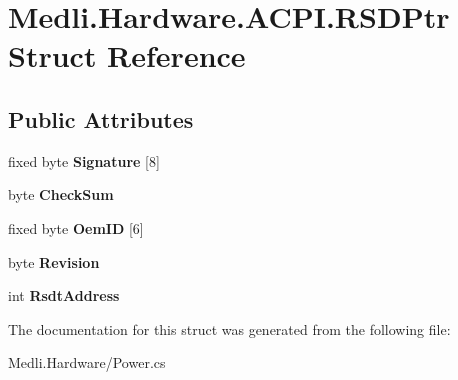 \hypertarget{struct_medli_1_1_hardware_1_1_a_c_p_i_1_1_r_s_d_ptr}{}\section{Medli.\+Hardware.\+A\+C\+P\+I.\+R\+S\+D\+Ptr Struct Reference}
\label{struct_medli_1_1_hardware_1_1_a_c_p_i_1_1_r_s_d_ptr}
\subsection*{Public Attributes}
\begin{DoxyCompactItemize}
\item 
\mbox{\label{struct_medli_1_1_hardware_1_1_a_c_p_i_1_1_r_s_d_ptr_ad05c7bc16e114453556ad8e32d99a1e0}} 
fixed byte {\bfseries Signature} \mbox{[}8\mbox{]}
\item 
\mbox{\label{struct_medli_1_1_hardware_1_1_a_c_p_i_1_1_r_s_d_ptr_afa2f1a1aa2bbb7f507fb534b07e79032}} 
byte {\bfseries Check\+Sum}
\item 
\mbox{\label{struct_medli_1_1_hardware_1_1_a_c_p_i_1_1_r_s_d_ptr_af276430a4c6bc4b329a673f7cdda72e6}} 
fixed byte {\bfseries Oem\+ID} \mbox{[}6\mbox{]}
\item 
\mbox{\label{struct_medli_1_1_hardware_1_1_a_c_p_i_1_1_r_s_d_ptr_ae9d18ec06d2feeab922f396674853d4b}} 
byte {\bfseries Revision}
\item 
\mbox{\label{struct_medli_1_1_hardware_1_1_a_c_p_i_1_1_r_s_d_ptr_ad9c3b629ce15de569237643d6308d4a2}} 
int {\bfseries Rsdt\+Address}
\end{DoxyCompactItemize}


The documentation for this struct was generated from the following file\+:\begin{DoxyCompactItemize}
\item 
Medli.\+Hardware/Power.\+cs\end{DoxyCompactItemize}
